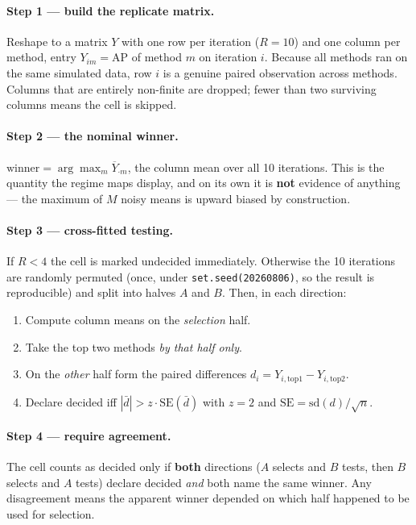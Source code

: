 \documentclass[11pt,a4paper]{article}
\begin{document}
\paragraph{Step 1 --- build the replicate matrix.}
Reshape to a matrix $Y$ with one row per iteration ($R=10$) and one column per
method, entry $Y_{im}=\mathrm{AP}$ of method $m$ on iteration $i$. Because all
methods ran on the same simulated data, row $i$ is a genuine paired
observation across methods. Columns that are entirely non-finite are dropped;
fewer than two surviving columns means the cell is skipped.

\paragraph{Step 2 --- the nominal winner.}
$\text{winner}=\arg\max_m \overline{Y}_{\cdot m}$, the column mean over all 10
iterations. This is the quantity the regime maps display, and on its own it is
\textbf{not} evidence of anything --- the maximum of $M$ noisy means is upward
biased by construction.

\paragraph{Step 3 --- cross-fitted testing.}
If $R<4$ the cell is marked undecided immediately. Otherwise the 10 iterations
are randomly permuted (once, under \texttt{set.seed(20260806)}, so the result is
reproducible) and split into halves $A$ and $B$. Then, in each direction:
\begin{enumerate}
\item Compute column means on the \emph{selection} half.
\item Take the top two methods \emph{by that half only}.
\item On the \emph{other} half form the paired differences
$d_i = Y_{i,\text{top1}} - Y_{i,\text{top2}}$.
\item Declare decided iff $|\bar d| > z\cdot\mathrm{SE}(\bar d)$ with $z=2$ and
$\mathrm{SE}=\mathrm{sd}(d)/\sqrt{n}$.
\end{enumerate}

\paragraph{Step 4 --- require agreement.}
The cell counts as decided only if \textbf{both} directions ($A$ selects and $B$
tests, then $B$ selects and $A$ tests) declare decided \emph{and} both name the
same winner. Any disagreement means the apparent winner depended on which half
happened to be used for selection.
\end{document}
